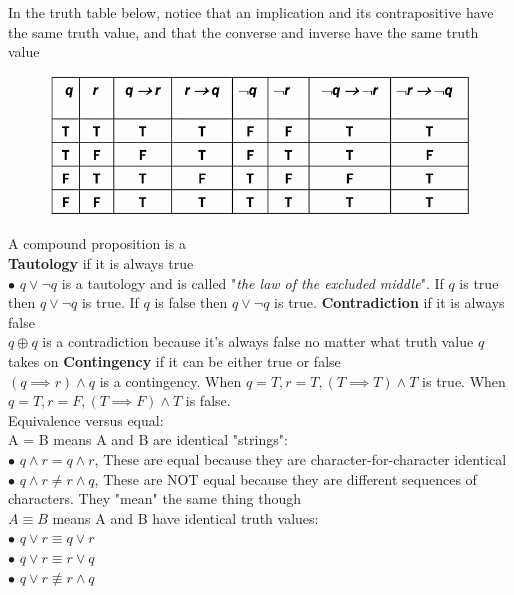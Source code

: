\documentclass{article}
\begin{document}
    In the truth table below, notice that an implication and its contrapositive have the same truth value, and that the converse and inverse have the same truth value

    \begin{figure}[hbt!]
        \centering
        \includegraphics[scale = 0.75]{Assets/Contrapositive}
    \end{figure}

    A compound proposition is a \\
    \textbf{Tautology} if it is always true \\
    $\bullet$ $q\lor \neg q$ is a tautology and is called "\textit{the law of the excluded middle}". If $q$ is true then $q\lor \neg q$ is true. If $q$ is false then $q\lor \neg q$ is true.
    \textbf{Contradiction} if it is always false \\
    $q \oplus q$ is a contradiction because it's always false no matter what truth value $q$ takes on
    \textbf{Contingency} if it can be either true or false \\
    $(q\implies r) \land q$ is a contingency. When $q=T,r=T,(T\implies T)\land T$ is true. When $q=T,r=F,(T\implies F)\land T$ is false. \\

    Equivalence versus equal: \\

    A = B means A and B are identical "strings": \\
    $\bullet$ $q\land r = q\land r$, These are equal because they are character-for-character identical
    $\bullet$ $q \land r \not = r \land q$, These are NOT equal because they are different sequences of characters. They "mean" the same thing though \\

    $A \equiv B$ means A and B have identical truth values: \\
    $\bullet$ $q\lor r \equiv q\lor r$ \\
    $\bullet$ $q\lor r \equiv r\lor q$ \\
    $\bullet$ $q\lor r \not \equiv r\land q$ \\
\end{document}
